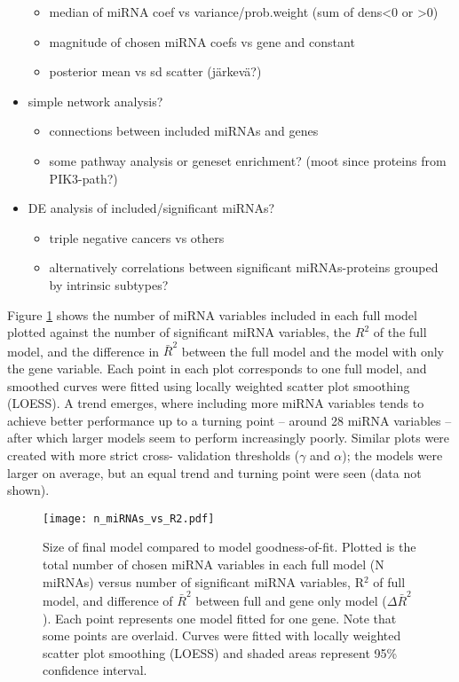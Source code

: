 \begin{itemize}
\begin{itemize}
    \item median of miRNA coef vs variance/prob.weight (sum of dens<0 or >0)
    \item magnitude of chosen miRNA coefs vs gene and constant
    \item posterior mean vs sd scatter (järkevä?)
  \end{itemize}
  \item simple network analysis?
  \begin{itemize}
    \item connections between included miRNAs and genes
    \item some pathway analysis or geneset enrichment? (moot since proteins from PIK3-path?)
  \end{itemize}
  \item DE analysis of included/significant miRNAs?
  \begin{itemize}
    \item triple negative cancers vs others
    \item alternatively correlations between significant miRNAs-proteins grouped by intrinsic subtypes?
  \end{itemize}

\end{itemize}

    

Figure \ref{n-miRNAs-vs-R2} shows the number of miRNA variables included in
each full model plotted against the number of significant miRNA variables, the
$R^2$ of the full model, and the difference in $\bar{R}^2$ between the full
model and the model with only the gene variable. Each point in each plot
corresponds to one full model, and smoothed curves were fitted using locally
weighted scatter plot smoothing (LOESS). A trend emerges, where including more
miRNA variables tends to achieve better performance up to a turning point --
around 28 miRNA variables -- after which larger models seem to perform
increasingly poorly. Similar plots were created with more strict cross-
validation thresholds ($\gamma$ and $\alpha$); the models were larger on
average, but an equal trend and turning point were seen (data not shown).

\begin{figure}[htb]
  \centering
  \texttt{[image: n\_miRNAs\_vs\_R2.pdf]}
  \caption{Size of final model compared to model goodness-of-fit. Plotted is the total number of chosen miRNA variables in each full model (N miRNAs) versus number of significant miRNA variables, R$^2$ of full model, and difference of $\bar{R}^2$ between full and gene only model ($\Delta\bar{R}^2$). Each point represents one model fitted for one gene. Note that some points are overlaid. Curves were fitted with locally weighted scatter plot smoothing (LOESS) and shaded areas represent 95\% confidence interval. \label{n-miRNAs-vs-R2}}
\end{figure}

